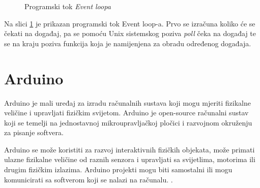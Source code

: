 \begin{figure}[H]
\centering
{}
\caption{Programski tok \emph{Event loopa}}
\label{fig:event_loop}
\end{figure}

Na slici \ref{fig:event_loop} je prikazan programski tok Event loop-a. Prvo se
izračuna koliko će se čekati na događaj, pa se pomoću Unix sistemskog poziva
\emph{poll} čeka na događaj te se na kraju poziva funkcija koja je namijenjena za
obradu određenog događaja.

\newpage
\section{Arduino}

Arduino je mali uređaj za izradu računalnih sustava koji mogu mjeriti fizikalne
veličine i upravljati fizičkim svijetom. Arduino je open-source računalni sustav
koji se temelji na jednostavnoj mikroupravljačkoj pločici i razvojnom okruženju za
pisanje softvera.

Arduino se može koristiti za razvoj interaktivnih fizičkih objekata, može
primati ulazne fizikalne veličine od raznih senzora i upravljati sa svijetlima,
motorima ili drugim fizičkim izlazima. Arduino projekti mogu biti samostalni ili
mogu komunicirati sa softverom koji se nalazi na računalu.
\cite{arduino_intro}.

